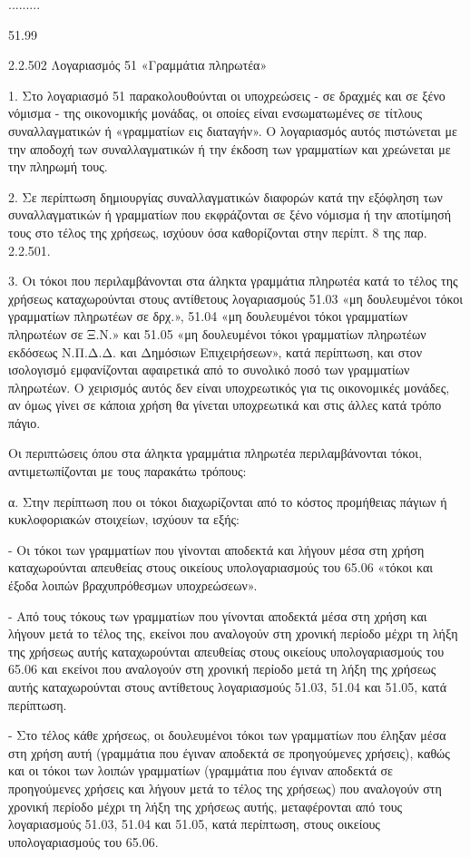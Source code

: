 \documentclass[A4,10pt,greek]{book}
\begin{document}
        .........

        51.99

 

2.2.502 Λογαριασμός 51 «Γραμμάτια πληρωτέα»

1. Στο λογαριασμό 51 παρακολουθούνται οι υποχρεώσεις - σε δραχμές και σε ξένο νόμισμα - της οικονομικής μονάδας, οι οποίες είναι ενσωματωμένες σε τίτλους συναλλαγματικών ή «γραμματίων εις διαταγήν». Ο λογαριασμός αυτός πιστώνεται με την αποδοχή των συναλλαγματικών ή την έκδοση των γραμματίων και χρεώνεται με την πληρωμή τους.

2. Σε περίπτωση δημιουργίας συναλλαγματικών διαφορών κατά την εξόφληση των συναλλαγματικών ή γραμματίων που εκφράζονται σε ξένο νόμισμα ή την αποτίμησή τους στο τέλος της χρήσεως, ισχύουν όσα καθορίζονται στην περίπτ. 8 της παρ.  2.2.501.

3. Οι τόκοι που περιλαμβάνονται στα άληκτα γραμμάτια πληρωτέα κατά το τέλος της χρήσεως καταχωρούνται στους αντίθετους λογαριασμούς 51.03 «μη δουλευμένοι τόκοι γραμματίων πληρωτέων σε δρχ.», 51.04 «μη δουλευμένοι τόκοι γραμματίων πληρωτέων σε Ξ.Ν.» και 51.05 «μη δουλευμένοι τόκοι γραμματίων πληρωτέων εκδόσεως Ν.Π.Δ.Δ. και Δημόσιων Επιχειρήσεων», κατά περίπτωση, και στον ισολογισμό εμφανίζονται αφαιρετικά από το συνολικό ποσό των γραμματίων πληρωτέων. Ο χειρισμός αυτός δεν είναι υποχρεωτικός για τις οικονομικές μονάδες, αν όμως γίνει σε κάποια χρήση θα γίνεται υποχρεωτικά και στις άλλες κατά τρόπο πάγιο.

Οι περιπτώσεις όπου στα άληκτα γραμμάτια πληρωτέα περιλαμβάνονται τόκοι, αντιμετωπίζονται με τους παρακάτω τρόπους:

α. Στην περίπτωση που οι τόκοι διαχωρίζονται από το κόστος προμήθειας πάγιων ή κυκλοφοριακών στοιχείων, ισχύουν τα εξής:

- Οι τόκοι των γραμματίων που γίνονται αποδεκτά και λήγουν μέσα στη χρήση καταχωρούνται απευθείας στους οικείους υπολογαριασμούς του 65.06 «τόκοι και έξοδα λοιπών βραχυπρόθεσμων υποχρεώσεων».

- Από τους τόκους των γραμματίων που γίνονται αποδεκτά μέσα στη χρήση και λήγουν μετά το τέλος της, εκείνοι που αναλογούν στη χρονική περίοδο μέχρι τη λήξη της χρήσεως αυτής καταχωρούνται απευθείας στους οικείους υπολογαριασμούς του 65.06 και εκείνοι που αναλογούν στη χρονική περίοδο μετά τη λήξη της χρήσεως αυτής καταχωρούνται στους αντίθετους λογαριασμούς 51.03, 51.04 και 51.05, κατά περίπτωση.

- Στο τέλος κάθε χρήσεως, οι δουλευμένοι τόκοι των γραμματίων που έληξαν μέσα στη χρήση αυτή (γραμμάτια που έγιναν αποδεκτά σε προηγούμενες χρήσεις), καθώς και οι τόκοι των λοιπών γραμματίων (γραμμάτια που έγιναν αποδεκτά σε προηγούμενες χρήσεις και λήγουν μετά το τέλος της χρήσεως) που αναλογούν στη χρονική περίοδο μέχρι τη λήξη της χρήσεως αυτής, μεταφέρονται από τους λογαριασμούς 51.03, 51.04 και 51.05, κατά περίπτωση, στους οικείους υπολογαριασμούς του 65.06.
\end{document}
